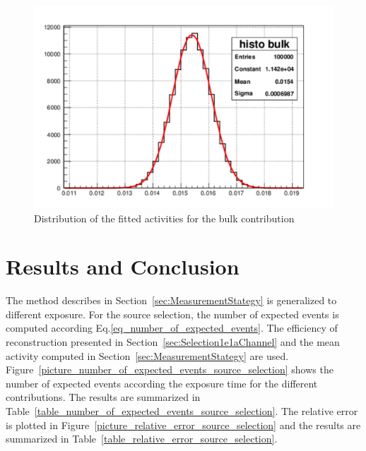 \documentclass[main.tex]{subfiles}
\begin{document}
\begin{figure}[h!]
\begin{center}
\includegraphics[scale=0.5]{pictures/Chap5/gaussian_bulk_activity.pdf}
\caption{Distribution of the fitted activities for the bulk contribution}
\label{gaus}
\end{center}
\end{figure}


\FloatBarrier




\section{Results and Conclusion}


\noindent The method describes in Section~\ref{sec:MeasurementStategy} is generalized to different exposure. For the source selection, the number of expected events is computed according Eq.\ref{eq_number_of_expected_events}. The efficiency of reconstruction presented in Section~\ref{sec:Selection1e1aChannel} and the mean activity computed in Section~\ref{sec:MeasurementStategy} are used. Figure~\ref{picture_number_of_expected_events_source_selection} shows the number of expected events according the exposure time for the different contributions. The results are summarized in Table~\ref{table_number_of_expected_events_source_selection}. The relative error is plotted in Figure~\ref{picture_relative_error_source_selection} and the results are summarized in Table~\ref{table_relative_error_source_selection}.
\end{document}
